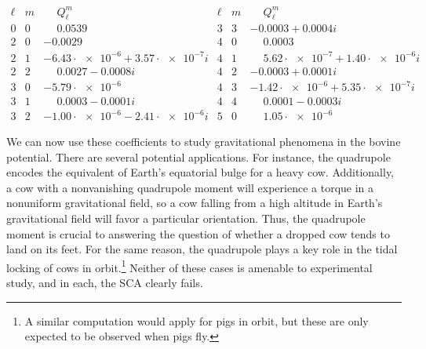 \documentclass[
    prd, twocolumn, nofootinbib, amsmath, amssymb,
    aps, floatfix, preprintnumbers
]{revtex4-2}
\begin{document}
\begin{table}
    {\scriptsize
    \begin{equation*}
    \begin{array}{lr|l||lr|l}
        \ell & m & \phantom{-}Q_\ell^m & \ell & m & \phantom{-}Q_\ell^m \\
        \hline
        0 & 0 & \phantom{-}0.0539\phantom{ + 0.0000ii}
            & 3 & 3 &
             -0.0003 + 0.0004i \\
        2 & 0 & -0.0029\phantom{ + 0.0000ii}
            & 4 & 0 &
             \phantom{-}0.0003\phantom{ + 0.0000ii} \\
        2 & 1 & -6.43\!\cdot\!\num{e-6} + 3.57\!\cdot\!\num{e-7}i
            & 4 & 1 &
             \phantom{-}5.62\!\cdot\!\num{e-7} + 1.40\!\cdot\!\num{e-6}i \\
        2 & 2 & \phantom{-}0.0027 - 0.0008i
            & 4 & 2 &
             -0.0003 + 0.0001i \\
        3 & 0 & -5.79\!\cdot\!\num{e-6}\phantom{ + 0.0000ii}
            & 4 & 3 &
             -1.42\!\cdot\!\num{e-6} + 5.35\!\cdot\!\num{e-7}i \\
        3 & 1 & \phantom{-}0.0003 - 0.0001i
            & 4 & 4 &
             \phantom{-}0.0001 - 0.0003i \\
        3 & 2 & -1.00\!\cdot\!\num{e-6} - 2.41\!\cdot\!\num{e-6}i
            & 5 & 0 &
             \phantom{-}1.05\!\cdot\!\num{e-6}\phantom{ + 0.0000ii}
    \end{array}
    \end{equation*}
    }
    \caption{Leading multipoles of the cow $\mathcal C$ treated as a mass distribution, computed about the center of mass in benchmark units. In barycentric coordinates, the dipole moment vanishes, so these components are omitted. Additionally, since $Q_\ell^{-m} = (-1)^m Q_\ell^{m*}$, only the positive-$m$ coefficients are shown.}
    \label{tab:mass-moments}
\end{table}

We can now use these coefficients to study gravitational phenomena in the bovine potential. There are several potential applications. For instance, the quadrupole encodes the equivalent of Earth's equatorial bulge for a heavy cow. Additionally, a cow with a nonvanishing quadrupole moment will experience a torque in a nonuniform gravitational field, so a cow falling from a high altitude in Earth's gravitational field will favor a particular orientation. Thus, the quadrupole moment is crucial to answering the question of whether a dropped cow tends to land on its feet. For the same reason, the quadrupole plays a key role in the tidal locking of cows in orbit.\footnote{A similar computation would apply for pigs in orbit, but these are only expected to be observed when pigs fly.} Neither of these cases is amenable to experimental study, and in each, the SCA clearly fails.
\end{document}
